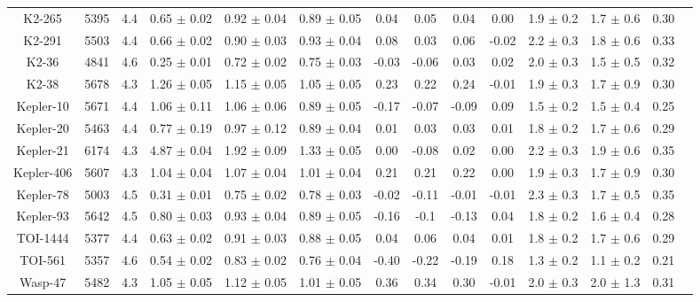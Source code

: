 \documentclass[twocolumn]{aastex631}
\begin{document}
\begin{table}
\begin{tabular}{|c|c|c|h|c|c|c|c|c|C|c|c|c|c|}
K2-265     & 5395      & 4.4        & 0.65 $\pm$ 0.02 & 0.92 $\pm$ 0.04 & 0.89 $\pm$ 0.05 & 0.04    & 0.05   & 0.04    &  0.00        & 1.9 $\pm$ 0.2 & 1.7 $\pm$ 0.6 & 0.30 \\ 
K2-291     & 5503      & 4.4        & 0.66 $\pm$ 0.02 & 0.90 $\pm$ 0.03 & 0.93 $\pm$ 0.04 & 0.08    & 0.03   & 0.06    &  -0.02       & 2.2 $\pm$ 0.3 & 1.8 $\pm$ 0.6 & 0.33 \\
K2-36      & 4841      & 4.6        & 0.25 $\pm$ 0.01 & 0.72 $\pm$ 0.02 & 0.75 $\pm$ 0.03 & -0.03   &-0.06   & 0.03    &  0.02        & 2.0 $\pm$ 0.3 & 1.5 $\pm$ 0.5 & 0.32 \\ 
K2-38      & 5678      & 4.3        & 1.26 $\pm$ 0.05 & 1.15 $\pm$ 0.05 & 1.05 $\pm$ 0.05 & 0.23    & 0.22   & 0.24    &  -0.01       & 1.9 $\pm$ 0.3 & 1.7 $\pm$ 0.9 & 0.30 \\
Kepler-10  & 5671      & 4.4        & 1.06 $\pm$ 0.11 & 1.06 $\pm$ 0.06 & 0.89 $\pm$ 0.05 & -0.17   &-0.07   & -0.09   &  0.09        & 1.5 $\pm$ 0.2 & 1.5 $\pm$ 0.4 & 0.25 \\
Kepler-20  & 5463      & 4.4        & 0.77 $\pm$ 0.19 & 0.97 $\pm$ 0.12 & 0.89 $\pm$ 0.04 &  0.01   & 0.03   & 0.03    &  0.01        & 1.8 $\pm$ 0.2 & 1.7 $\pm$ 0.6 & 0.29 \\
Kepler-21  & 6174      & 4.3        & 4.87 $\pm$ 0.04 & 1.92 $\pm$ 0.09 & 1.33 $\pm$ 0.05 &  0.00   &-0.08   & 0.02    &  0.00        & 2.2 $\pm$ 0.3 & 1.9 $\pm$ 0.6 & 0.35 \\
Kepler-406 & 5607      & 4.3        & 1.04 $\pm$ 0.04 & 1.07 $\pm$ 0.04 & 1.01 $\pm$ 0.04 & 0.21    & 0.21   & 0.22    &   0.00      & 1.9 $\pm$ 0.3 & 1.7 $\pm$ 0.9 & 0.30 \\
Kepler-78  & 5003      & 4.5        & 0.31 $\pm$ 0.01 & 0.75 $\pm$ 0.02 & 0.78 $\pm$ 0.03 & -0.02   &-0.11   & -0.01   & -0.01        & 2.3 $\pm$ 0.3 & 1.7 $\pm$ 0.5 & 0.35 \\
Kepler-93  & 5642      & 4.5        & 0.80 $\pm$ 0.03 & 0.93 $\pm$ 0.04 & 0.89 $\pm$ 0.05 & -0.16   & -0.1   & -0.13   &  0.04        & 1.8 $\pm$ 0.2 & 1.6 $\pm$ 0.4 & 0.28 \\ 
TOI-1444   & 5377      & 4.4        & 0.63 $\pm$ 0.02 & 0.91 $\pm$ 0.03 & 0.88 $\pm$ 0.05 & 0.04    & 0.06   & 0.04    &  0.01        & 1.8 $\pm$ 0.2 & 1.7 $\pm$ 0.6 & 0.29 \\
TOI-561    & 5357      & 4.6        & 0.54 $\pm$ 0.02 & 0.83 $\pm$ 0.02 & 0.76 $\pm$ 0.04 & -0.40   &-0.22   & -0.19   &  0.18        & 1.3 $\pm$ 0.2 & 1.1 $\pm$ 0.2 & 0.21 \\
Wasp-47    & 5482      & 4.3        & 1.05 $\pm$ 0.05 & 1.12 $\pm$ 0.05 & 1.01 $\pm$ 0.05 & 0.36    & 0.34   & 0.30    &  -0.01       & 2.0 $\pm$ 0.3 & 2.0 $\pm$ 1.3 & 0.31 \\ \hline


\end{tabular}
\end{table}
\end{document}
